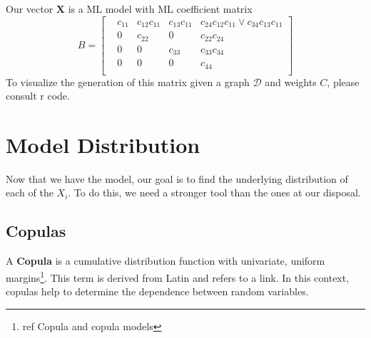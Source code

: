 \documentclass[12pt]{article}
\def\d{\mathcal{D}}
\def\x{\mathbf{X}}
\theoremstyle{definition}
\theoremstyle{definition}
\begin{document}
\break
\noindent 
Our vector $\x$ is a ML model with ML coefficient matrix 
\[ B=\begin{bmatrix}
&c_{11} &c_{12}c_{11} & c_{13}c_{11}& c_{24}c_{12}c_{11}\vee c_{34}c_{13}c_{11}\\
&0 & c_{22} & 0& c_{22}c_{24}\\
&0&0 &c_{33} & c_{33}c_{34} \\
&0& 0 & 0 & c_{44}\\
\end{bmatrix}
\]
To visualize the generation of this matrix given a graph $\d$ and weights $C$, please consult r code.

\pagebreak

\section{Model Distribution}
Now that we have the model, our goal is to find the underlying distribution of each of the $X_i$. To do this, we need a stronger tool than the ones at our disposal.

\subsection{Copulas}
A \textbf{Copula} is a cumulative distribution function with univariate, uniform margins\footnote{ref Copula and copula models}. This term is derived from Latin and refers to a link. In this context, copulas help to determine the dependence between random variables.
\end{document}
